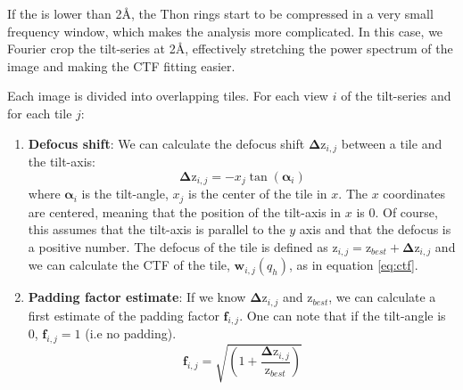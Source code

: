 \begin{note}If the  is lower than 2\si{\angstrom}, the Thon rings start to be compressed in a very small frequency window, which makes the analysis more complicated. In this case, we Fourier crop the tilt-series at 2\si{\angstrom}, effectively stretching the power spectrum of the image and making the CTF fitting easier.
\end{note}


Each image is divided into overlapping tiles. For each view $i$ of the tilt-series and for each tile $j$:

\begin{enumerate}
    \item \textbf{Defocus shift}: We can calculate the defocus shift $\bm{\Delta \mathrm{z}}_{i,j}$ between a tile and the tilt-axis:
    \begin{equation}
        \bm{\Delta \mathrm{z}}_{i,j} = -x_{j}\tan(\bm{\alpha}_i)
    \end{equation}
    where $\bm{\alpha}_i$ is the tilt-angle, $x_{j}$ is the center of the tile in $x$. The $x$ coordinates are centered, meaning that the position of the tilt-axis in $x$ is 0. Of course, this assumes that the tilt-axis is parallel to the $y$ axis and that the defocus is a positive number. The defocus of the tile is defined as $\bm{\mathrm{z}}_{i,j} = \bm{\mathrm{z}}_{best} + \bm{\Delta \mathrm{z}}_{i,j}$ and we can calculate the CTF of the tile, $\bm{w}_{i,j}(q_h)$, as in equation \ref{eq:ctf}.

    \item \textbf{Padding factor estimate}: If we know $\bm{\Delta \mathrm{z}}_{i,j}$ and $\bm{\mathrm{z}}_{best}$, we can calculate a first estimate of the padding factor $\bm{f}_{i,j}$. One can note that if the tilt-angle is 0\textdegree, $\bm{f}_{i,j} = 1$ (i.e no padding).
    \begin{equation}
        \bm{f}_{i,j} = \sqrt{ \left( 1 + \frac{ \bm{\Delta \mathrm{z}}_{i,j} }{ \bm{ \mathrm{z}}_{best} } \right) }
    \end{equation}


\end{enumerate}
